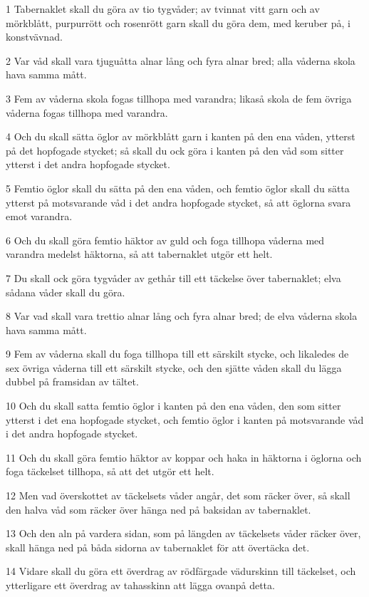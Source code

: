\par 1 Tabernaklet skall du göra av tio tygvåder; av tvinnat vitt garn och av mörkblått, purpurrött och rosenrött garn skall du göra dem, med keruber på, i konstvävnad.
\par 2 Var våd skall vara tjuguåtta alnar lång och fyra alnar bred; alla våderna skola hava samma mått.
\par 3 Fem av våderna skola fogas tillhopa med varandra; likaså skola de fem övriga våderna fogas tillhopa med varandra.
\par 4 Och du skall sätta öglor av mörkblått garn i kanten på den ena våden, ytterst på det hopfogade stycket; så skall du ock göra i kanten på den våd som sitter ytterst i det andra hopfogade stycket.
\par 5 Femtio öglor skall du sätta på den ena våden, och femtio öglor skall du sätta ytterst på motsvarande våd i det andra hopfogade stycket, så att öglorna svara emot varandra.
\par 6 Och du skall göra femtio häktor av guld och foga tillhopa våderna med varandra medelst häktorna, så att tabernaklet utgör ett helt.
\par 7 Du skall ock göra tygvåder av gethår till ett täckelse över tabernaklet; elva sådana våder skall du göra.
\par 8 Var vad skall vara trettio alnar lång och fyra alnar bred; de elva våderna skola hava samma mått.
\par 9 Fem av våderna skall du foga tillhopa till ett särskilt stycke, och likaledes de sex övriga våderna till ett särskilt stycke, och den sjätte våden skall du lägga dubbel på framsidan av tältet.
\par 10 Och du skall satta femtio öglor i kanten på den ena våden, den som sitter ytterst i det ena hopfogade stycket, och femtio öglor i kanten på motsvarande våd i det andra hopfogade stycket.
\par 11 Och du skall göra femtio häktor av koppar och haka in häktorna i öglorna och foga täckelset tillhopa, så att det utgör ett helt.
\par 12 Men vad överskottet av täckelsets våder angår, det som räcker över, så skall den halva våd som räcker över hänga ned på baksidan av tabernaklet.
\par 13 Och den aln på vardera sidan, som på längden av täckelsets våder räcker över, skall hänga ned på båda sidorna av tabernaklet för att övertäcka det.
\par 14 Vidare skall du göra ett överdrag av rödfärgade vädurskinn till täckelset, och ytterligare ett överdrag av tahasskinn att lägga ovanpå detta.
